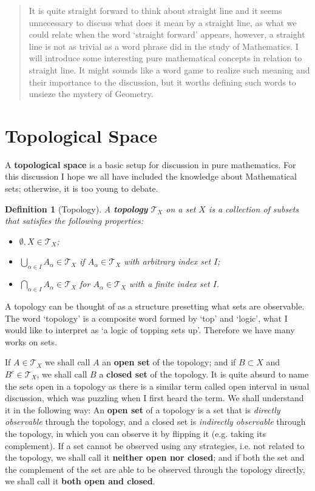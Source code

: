 \documentclass[12pt]{article}
\newtheorem{definition}{Definition}[section]
\begin{document}
    \begin{abstract}
        It is quite straight forward to think about straight line and it seems unnecessary to discuss what does it mean by a straight line, as what we could relate when the word `straight forward' appears, however, a straight line is not as trivial as a word phrase did in the study of Mathematics. I will introduce some interesting pure mathematical concepts in relation to straight line. It might sounds like a word game to realize such meaning and their importance to the discussion, but it worths defining such words to unsieze the mystery of Geometry.
    \end{abstract}

    \section{Topological Space}

    A \textbf{topological space} is a basic setup for discussion in pure mathematics. For this discussion I hope we all have included the knowledge about Mathematical sets; otherwise, it is too young to debate.

    \begin{definition}[Topology]
        A \textbf{topology} $\mathcal{T}_X$ on a set $X$ is a collection of subsets that satisfies the following properties:\begin{itemize}
            \item $\emptyset, X\in \mathcal{T}_X$;
            \item $\bigcup_{\alpha\in I} A_{\alpha}\in \mathcal{T}_X$ if $A_{\alpha}\in\mathcal{T}_X$ with arbitrary index set $I$;
            \item $\bigcap_{\alpha\in I} A_\alpha \in \mathcal{T}_X$ for $A_\alpha\in\mathcal{T}_X$ with a finite index set $I$.
        \end{itemize}
    \end{definition}

    A topology can be thought of as a structure presetting what sets are observable. The word `topology' is a composite word formed by `top' and `logic', what I would like to interpret as `a logic of topping sets up'. Therefore we have many works on sets. 

    If $A\in \mathcal{T}_X$ we shall call $A$ an \textbf{open set} of the topology; and if $B\subset X$ and $B^c\in\mathcal{T}_X$, we shall call $B$ a \textbf{closed set} of the topology. It is quite absurd to name the sets open in a topology as there is a similar term called open interval in usual discussion, which was puzzling when I first heard the term. We shall understand it in the following way: An \textbf{open set} of a topology is a set that is \textit{directly observable} through the topology, and a closed set is \textit{indirectly observable} through the topology, in which you can observe it by flipping it (e.g. taking its complement). If a set cannot be observed using any strategies, i.e. not related to the topology, we shall call it \textbf{neither open nor closed}; and if both the set and the complement of the set are able to be observed through the topology directly, we shall call it \textbf{both open and closed}.
\end{document}
